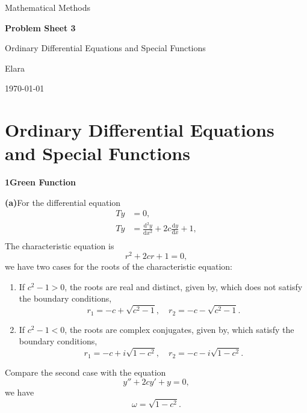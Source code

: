 \documentclass[12pt]{article}
\newcommand{\studentname}{Elara}
\newcommand{\coursename}{Mathematical Methods}
\newcommand{\sheetnumber}{Problem Sheet 3}
\newcommand{\assignmenttitle}{Ordinary Differential Equations and Special Functions}
\newcommand{\submissiondate}{\today}
\newcommand{\problem}[2]{%
    \par\vspace{1em}
    \noindent\textbf{#1\quad #2}
    \par\smallskip
}
\begin{document}
\begin{titlepage}
    \centering

    {\large \coursename\par}

    \vfill

    {\LARGE\bfseries \sheetnumber\par}

    \vspace{1cm}

    {\large \assignmenttitle\par}

    \vspace{1cm}

    {\large \studentname\par}

    \vspace{0.5cm}

    {\large \submissiondate\par}

    \vfill
\end{titlepage}

\pagebreak

\section*{\assignmenttitle}

\problem{1}{Green Function}
\noindent\textbf{(a)}\quad For the differential equation
\begin{equation}
\begin{split}
    Ty &= 0,\\
    Ty &= \frac{\mathrm{d}^2 y}{\mathrm{d}x^2} + 2c \frac{\mathrm{d}y}{\mathrm{d}x} + 1,\\
\end{split}
\end{equation}
The characteristic equation is
\begin{equation}
    r^2 + 2cr + 1 = 0,
\end{equation}
we have two cases for the roots of the characteristic equation:
\begin{enumerate}
    \item If $c^2 - 1 > 0$, the roots are real and distinct, given by, which does not satisfy the boundary conditions,
    \begin{equation}
        r_1 = -c + \sqrt{c^2 - 1}, \quad r_2 = -c - \sqrt{c^2 - 1}.
    \end{equation}
    \item If $c^2 - 1 < 0$, the roots are complex conjugates, given by, which satisfy the boundary conditions,
    \begin{equation}
        r_1 = -c + i\sqrt{1 - c^2}, \quad r_2 = -c - i\sqrt{1 - c^2}.
    \end{equation}
\end{enumerate}
Compare the second case with the equation
\begin{equation}
    y'' + 2cy' + y = 0,
\end{equation}
we have 
\begin{equation}
    \omega = \sqrt{1 - c^2}.
\end{equation}
\end{document}
